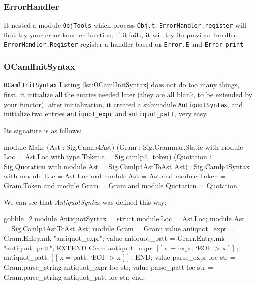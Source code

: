 \subsubsection{ErrorHandler}
\label{sec:errorhandler}

It nested a module \verb|ObjTools| which process
\verb|Obj.t|. \verb|ErrorHandler.register| will first try your error
handler function, if it fails, it will try its previous
handler. \verb|ErrorHandler.Register| register a handler based on
\verb|Error.E| and \verb|Error.print|


\subsubsection{OCamlInitSyntax}
\label{sec:ocamlinitsyntax}

\verb|OCamlInitSyntax| Listing \ref{lst:OCamlInitSyntax} does not do
too many things, first, it initialize all the entries needed later
(they are all blank, to be extended by your functor), after
initialization, it created a submodule \verb|AntiquotSyntax|, and
initialize two entries \verb|antiquot_expr| and \verb|antiquot_patt|,
very easy.

Its signature is as follows:

\begin{ocamlcode}
module Make (Ast     : Sig.Camlp4Ast)
            (Gram    : Sig.Grammar.Static with module Loc = Ast.Loc
                        with type Token.t = Sig.camlp4_token)
           (Quotation : Sig.Quotation with
                        module Ast = Sig.Camlp4AstToAst Ast)
: Sig.Camlp4Syntax with module Loc = Ast.Loc
                    and module Ast = Ast
                    and module Token = Gram.Token
                    and module Gram = Gram
                    and module Quotation = Quotation  
\end{ocamlcode}
We can see that \textit{AntiquotSyntax} was defined this way:

\begin{ocamlcode*}{gobble=2}
  module AntiquotSyntax = struct
    module Loc  = Ast.Loc;
    module Ast  = Sig.Camlp4AstToAst Ast;
    module Gram = Gram;
    value antiquot_expr = Gram.Entry.mk "antiquot_expr";
    value antiquot_patt = Gram.Entry.mk "antiquot_patt";
    EXTEND Gram
      antiquot_expr:
        [ [ x = expr; `EOI -> x ] ]
      ;
      antiquot_patt:
        [ [ x = patt; `EOI -> x ] ]
      ;
    END;
    value parse_expr loc str = Gram.parse_string antiquot_expr loc str;
    value parse_patt loc str = Gram.parse_string antiquot_patt loc str;
  end;
\end{ocamlcode*}
                  

